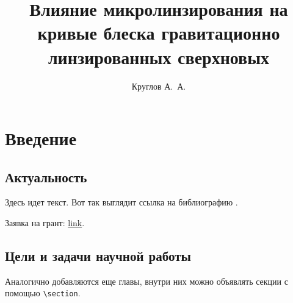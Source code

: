 \documentclass{mipt-thesis-bs}
\title{Влияние микролинзирования на кривые
           блеска гравитационно линзированных сверхновых}
\author{Круглов А.\ А.}
\begin{document}
    \frontmatter
    
    \titlecontents
    
    \mainmatter


\chapter{Введение}

    \section{Актуальность}
    Здесь идет текст. Вот так выглядит ссылка на библиографию \cite{adams1995hitchhiker}.
    
    Заявка на грант: \href{https://docs.google.com/document/d/1LeG-XjcpTT6cA9TJIDq61qVxFLF8IR38VrDoK6hkXco/edit?ts=5b23a829#}{link}.
    \section{Цели и задачи научной работы}
    Аналогично добавляются \cite[chapter 2]{langmuir26} еще главы, внутри них можно объявлять секции с помощью \verb|\section|.


    \backmatter

    \printbib
   
    
\end{document}
